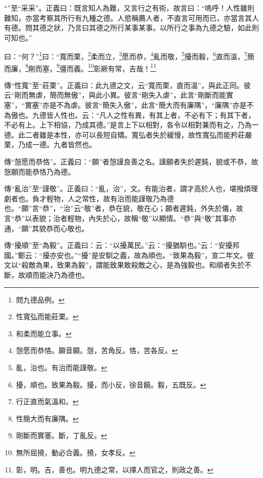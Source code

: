 {\noindent\shu{}\fzkt “”至“采采”。正義曰：既言知人為難，又言行之有術，故言曰：“嗚呼！人性雖則難知，亦當考察其所行有九種之德。人慾稱薦人者，不直言可用而已，亦當言其人有德。問其德之狀，乃言曰其德之所行某事某事。以所行之事為九德之驗，如此則可知也。” \par}

曰：“何？”\footnote{問九德品例。}曰：“寬而栗，\footnote{性寬弘而能莊栗。}柔而立，\footnote{和柔而能立事。}愿而恭，\footnote{愨愿而恭恪。願音願。愨，苦角反。恪，苦各反。}亂而敬，\footnote{亂，治也。有治而能謹敬。}擾而毅，\footnote{擾，順也。致果為毅。擾，而小反，徐音饒。毅，五既反。}直而溫，\footnote{行正直而氣溫和。}簡而廉，\footnote{性簡大而有廉隅。}剛而塞，\footnote{剛斷而實塞。斷，丁亂反。}彊而義。\footnote{無所屈撓，動必合義。撓，女孝反。}彰厥有常，吉哉！\footnote{彰，明。吉，善也。明九德之常，以擇人而官之，則政之善。}

{\noindent\zhuan{}\fzbyks 傳“性寬”至“莊栗”。正義曰：此九德之文，云“寬而栗，直而溫”，與此正同。彼云“剛而無虐，簡而無傲”，與此小異。彼言“剛失入虐”，此言“剛斷而能實塞”，“實塞”亦是不為虐。彼言“簡失入傲”，此言“簡大而有廉隅”，“廉隅”亦是不為傲也。九德皆人性也。云：“凡人之性有異，有其上者，不必有下；有其下者，不必有上。上下相協，乃成其德。”是言上下以相對，各令以相對兼而有之，乃為一德。此二者雖是本性，亦可以長短自矯。寬弘者失於緩慢，故性寬弘而能矜莊嚴栗，乃成一德。九者皆然也。 \par}

{\noindent\zhuan{}\fzbyks 傳“愨愿而恭恪”。正義曰：“願”者愨謹良善之名。謹願者失於遲鈍，貌或不恭，故愨願而能恭恪乃為德。 \par}

{\noindent\zhuan{}\fzbyks 傳“亂治”至“謹敬”。正義曰：“亂，治”，文。有能治者，謂才高於人也，堪撥煩理劇者也。負才輕物，人之常性，故有治而能謹敬乃為德也。“願”言“恭”，“治”云“敬”者，恭在貌，敬在心；願者遲鈍，外失於儀，故言“恭”以表貌；治者輕物，內失於心，故稱“敬”以顯情。“恭”與“敬”其事亦通，“願”其貌恭而心敬也。 \par}

{\noindent\zhuan{}\fzbyks 傳“擾順”至“為毅”。正義曰：云：“以擾萬民。”云：“擾猶馴也。”云：“安擾邦國。”鄭云：“擾亦安也。”“擾”是安馴之義，故為順也。“致果為毅”，宣二年文。彼文以“殺敵為果，致果為毅”，謂能致果敢殺敵之心，是為強毅也。和順者失於不斷，故順而能決乃為德也。 \par}

